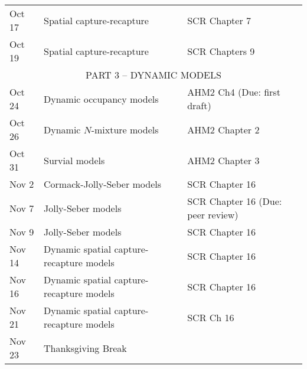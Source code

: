\documentclass[12pt]{article}
\begin{document}
\begin{center}
\begin{tabular}[c]{lll}
\hline
Oct 17     & Spatial capture-recapture                    & SCR Chapter 7                                         \\
Oct 19     & Spatial capture-recapture                    & SCR Chapters 9                                        \\
\hline
           \multicolumn{3}{c}{PART 3 -- DYNAMIC MODELS}                                                           \\
\hline
Oct 24     & Dynamic occupancy models                     & AHM2 Ch4 (Due: first draft)                           \\
Oct 26     & Dynamic $N$-mixture models                   & AHM2 Chapter 2                                        \\
\hline
Oct 31     & Survial models                               & AHM2 Chapter 3                                        \\
Nov 2      & Cormack-Jolly-Seber models                   & SCR Chapter 16                                        \\
\hline
Nov 7      & Jolly-Seber models                           & SCR Chapter 16 (Due: peer review)                     \\
Nov 9      & Jolly-Seber models                           & SCR Chapter 16                                        \\
\hline
Nov 14     & Dynamic spatial capture-recapture models     & SCR Chapter 16                                        \\
Nov 16     & Dynamic spatial capture-recapture models     & SCR Chapter 16                                        \\
\hline
Nov 21     & Dynamic spatial capture-recapture models     & SCR Ch 16                                             \\
Nov 23     & Thanksgiving Break                           &                                                       \\

\end{tabular}
\end{center}
\end{document}
